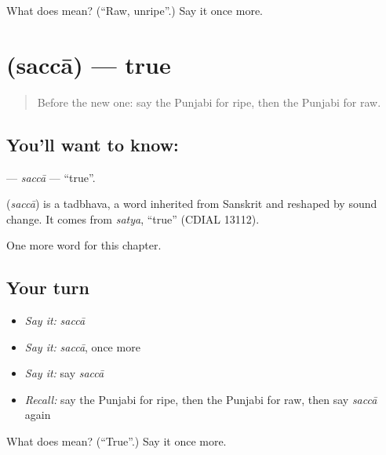 \begin{tcolorbox}[breakable,colback=teal!4,colframe=teal!35!black,title={Before you move on}]
What does  mean? (\textquotedblleft{}Raw, unripe\textquotedblright{}.) Say it once more.
\end{tcolorbox}
\section[\texorpdfstring{\pa{ਸੱਚਾ} (saccā)}{ਸੱਚਾ (saccā)}]{ (saccā) — true}

\label{lesson:PA-C146-sacca}



\begin{quote}
Before the new one: say the Punjabi for ripe, then the Punjabi for raw.
\end{quote}

\subsection*{You'll want to know: }
\textbf{} — \emph{saccā} — \textquotedblleft{}true\textquotedblright{}.

\begin{cousinweb}
\textbf{} (\emph{saccā}) is a tadbhava, a word inherited from Sanskrit and reshaped by sound change. It comes from \emph{satya}, \textquotedblleft{}true\textquotedblright{} (CDIAL 13112).
\end{cousinweb}

\begin{grammarlens}[title={What you've built}]
One more word for this chapter.
\end{grammarlens}

\subsection*{Your turn}
\begin{itemize}
\raggedright
  \item \emph{Say it:} \emph{saccā}
  \item \emph{Say it:} \emph{saccā}, once more
  \item \emph{Say it:} say \emph{saccā}
  \item \emph{Recall:} say the Punjabi for ripe, then the Punjabi for raw, then say \emph{saccā} again
\end{itemize}

\begin{tcolorbox}[breakable,colback=teal!4,colframe=teal!35!black,title={Before you move on}]
What does  mean? (\textquotedblleft{}True\textquotedblright{}.) Say it once more.
\end{tcolorbox}
